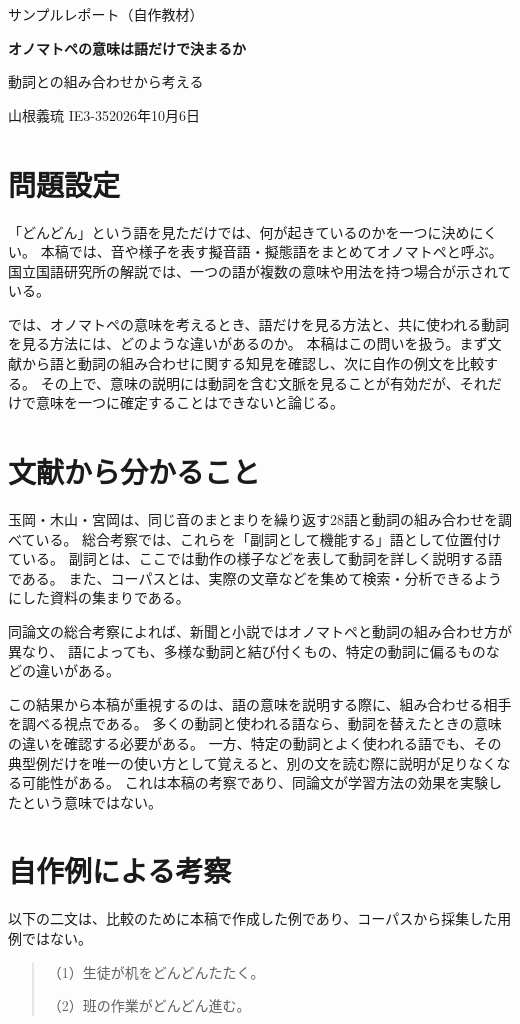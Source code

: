 \documentclass[a4paper,11pt]{ltjsarticle}
\begin{document}
\begin{center}
  {\small サンプルレポート（自作教材）}\par\medskip
  {\Large\bfseries オノマトペの意味は語だけで決まるか}\par\smallskip
  {動詞との組み合わせから考える}\par\medskip
  {山根義琉 IE3-35\quad 2026年10月6日}
\end{center}

\section{問題設定}
「どんどん」という語を見ただけでは、何が起きているのかを一つに決めにくい。
本稿では、音や様子を表す擬音語・擬態語をまとめてオノマトペと呼ぶ。
国立国語研究所の解説では、一つの語が複数の意味や用法を持つ場合が示されている。

では、オノマトペの意味を考えるとき、語だけを見る方法と、共に使われる動詞を見る方法には、どのような違いがあるのか。
本稿はこの問いを扱う。まず文献から語と動詞の組み合わせに関する知見を確認し、次に自作の例文を比較する。
その上で、意味の説明には動詞を含む文脈を見ることが有効だが、それだけで意味を一つに確定することはできないと論じる。

\section{文献から分かること}
玉岡・木山・宮岡は、同じ音のまとまりを繰り返す28語と動詞の組み合わせを調べている。
総合考察では、これらを「副詞として機能する」語として位置付けている。
副詞とは、ここでは動作の様子などを表して動詞を詳しく説明する語である。
また、コーパスとは、実際の文章などを集めて検索・分析できるようにした資料の集まりである。

同論文の総合考察によれば、新聞と小説ではオノマトペと動詞の組み合わせ方が異なり、
語によっても、多様な動詞と結び付くもの、特定の動詞に偏るものなどの違いがある。

この結果から本稿が重視するのは、語の意味を説明する際に、組み合わせる相手を調べる視点である。
多くの動詞と使われる語なら、動詞を替えたときの意味の違いを確認する必要がある。
一方、特定の動詞とよく使われる語でも、その典型例だけを唯一の使い方として覚えると、別の文を読む際に説明が足りなくなる可能性がある。
これは本稿の考察であり、同論文が学習方法の効果を実験したという意味ではない。

\newpage
\section{自作例による考察}
以下の二文は、比較のために本稿で作成した例であり、コーパスから採集した用例ではない。
\begin{quote}
  （1）生徒が机をどんどんたたく。\par
  （2）班の作業がどんどん進む。
\end{quote}
\end{document}
